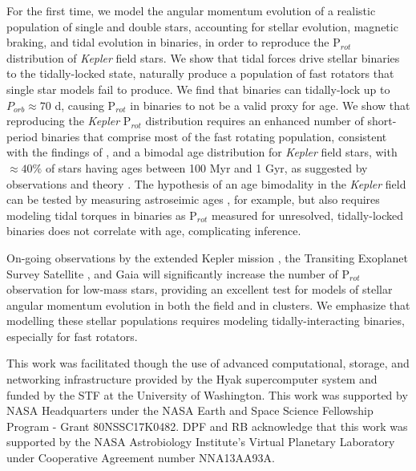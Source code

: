 \documentclass[twocolumn]{aastex61}
\begin{document}
For the first time, we model the angular momentum evolution of a realistic population of single and double stars, accounting for stellar evolution, magnetic braking, and tidal evolution in binaries, in order to reproduce the P$_{rot}$ distribution of \textit{Kepler} field stars.  We show that tidal forces drive stellar binaries to the tidally-locked state, naturally produce a population of fast rotators that single star models fail to produce.  We find that binaries can tidally-lock up to $P_{orb} \approx 70$ d, causing P$_{rot}$ in binaries to not be a valid proxy for age.  We show that reproducing the \textit{Kepler} P$_{rot}$ distribution requires an enhanced number of short-period binaries that comprise most of the fast rotating population, consistent with the findings of \citet{Simonian2018}, and a bimodal age distribution for \textit{Kepler} field stars, with $\approx 40\%$ of stars having ages between 100 Myr and 1 Gyr, as suggested by observations \citep{McQuillan2014,Davenport2017} and theory \citep{Matt2015}. The hypothesis of an age bimodality in the \textit{Kepler} field can be tested by measuring astroseimic ages \citep[e.g.][]{Ulrich1986,Silva2015}, for example, but also requires modeling tidal torques in binaries as P$_{rot}$ measured for unresolved, tidally-locked binaries does not correlate with age, complicating inference.

On-going observations by the extended Kepler mission \citep[K2,][]{Howell2014}, the Transiting Exoplanet Survey Satellite \citep{Ricker2014}, and Gaia \citep{Gaia2016,Lanzafame2018} will significantly increase the number of P$_{rot}$ observation for low-mass stars, providing an excellent test for models of stellar angular momentum evolution in both the field and in clusters.  We emphasize that modelling these stellar populations requires modeling tidally-interacting binaries, especially for fast rotators.

\acknowledgments
This work was facilitated though the use of advanced computational, storage, and networking infrastructure provided by the Hyak supercomputer system and funded by the STF at the University of Washington. This work was supported by NASA Headquarters under the NASA Earth and Space Science Fellowship Program - Grant 80NSSC17K0482.  DPF and RB acknowledge that this work was supported by the NASA Astrobiology Institute's Virtual Planetary Laboratory under Cooperative Agreement number NNA13AA93A. 



\end{document}

